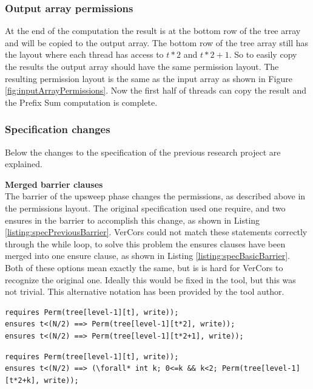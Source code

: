 \documentclass[a4paper]{article}
\begin{document}
\subsubsection{Output array permissions}
At the end of the computation the result is at the bottom row of the tree array and will be copied to the output array. The bottom row of the tree array still has the layout where each thread has access to $t*2$ and $t*2+1$. So to easily copy the results the output array should have the same permission layout. The resulting permission layout is the same as the input array as shown in Figure \ref{fig:inputArrayPermissions}. Now the first half of threads can copy the result and the Prefix Sum computation is complete.


\subsubsection{Specification changes}
Below the changes to the specification of the previous research project are explained.

\textbf{Merged barrier clauses}\\
The barrier of the upsweep phase changes the permissions, as described above in the permissions layout. The original specification used one require, and two ensures in the barrier to accomplish this change, as shown in Listing \ref{listing:specPreviousBarrier}. VerCors could not match these statements correctly through the while loop, to solve this problem the ensures clauses have been merged into one ensure clause, as shown in Listing \ref{listing:specBasicBarrier}. Both of these options mean exactly the same, but is is hard for VerCors to recognize the original one. Ideally this would be fixed in the tool, but this was not trivial. This alternative notation has been provided by the tool author.

\begin{lstlisting}[caption=Upsweep barrier permissions clauses (before merging), label=listing:specPreviousBarrier, float=htpb]
requires Perm(tree[level-1][t], write));
ensures t<(N/2) ==> Perm(tree[level-1][t*2], write));
ensures t<(N/2) ==> Perm(tree[level-1][t*2+1], write));
\end{lstlisting}

\begin{lstlisting}[caption=Upsweep barrier permissions clauses (after merging), label=listing:specBasicBarrier, float=htpb]
requires Perm(tree[level-1][t], write));
ensures t<(N/2) ==> (\forall* int k; 0<=k && k<2; Perm(tree[level-1][t*2+k], write));
\end{lstlisting}
\end{document}
